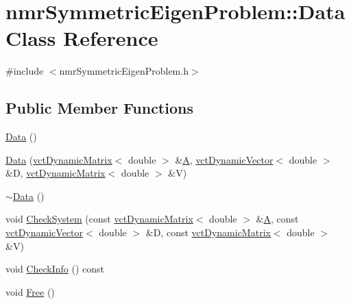 \hypertarget{classnmr_symmetric_eigen_problem_1_1_data}{}\section{nmr\+Symmetric\+Eigen\+Problem\+:\+:Data Class Reference}
\label{classnmr_symmetric_eigen_problem_1_1_data}


{\ttfamily \#include $<$nmr\+Symmetric\+Eigen\+Problem.\+h$>$}

\subsection*{Public Member Functions}
\begin{DoxyCompactItemize}
\item 
\hyperlink{classnmr_symmetric_eigen_problem_1_1_data_ab47d7e5d47a9f6a75f463c1af12c0719}{Data} ()
\item 
\hyperlink{classnmr_symmetric_eigen_problem_1_1_data_a3e60769966b903dbba7934c535393b1f}{Data} (\hyperlink{classvct_dynamic_matrix}{vct\+Dynamic\+Matrix}$<$ double $>$ \&\hyperlink{classnmr_symmetric_eigen_problem_1_1_data_aa45f414eef4fb85b15868757aa728448}{A}, \hyperlink{classvct_dynamic_vector}{vct\+Dynamic\+Vector}$<$ double $>$ \&D, \hyperlink{classvct_dynamic_matrix}{vct\+Dynamic\+Matrix}$<$ double $>$ \&V)
\item 
\hyperlink{classnmr_symmetric_eigen_problem_1_1_data_a4f96b51dba64f2160c5a0362620b009d}{$\sim$\+Data} ()
\item 
void \hyperlink{classnmr_symmetric_eigen_problem_1_1_data_a555f17d5c94a1f7c4068160b5ca4d7f0}{Check\+System} (const \hyperlink{classvct_dynamic_matrix}{vct\+Dynamic\+Matrix}$<$ double $>$ \&\hyperlink{classnmr_symmetric_eigen_problem_1_1_data_aa45f414eef4fb85b15868757aa728448}{A}, const \hyperlink{classvct_dynamic_vector}{vct\+Dynamic\+Vector}$<$ double $>$ \&D, const \hyperlink{classvct_dynamic_matrix}{vct\+Dynamic\+Matrix}$<$ double $>$ \&V)
\item 
void \hyperlink{classnmr_symmetric_eigen_problem_1_1_data_a033b1e23dd6b104573c14bc441b15c4d}{Check\+Info} () const 
\item 
void \hyperlink{classnmr_symmetric_eigen_problem_1_1_data_a388d72081578e7e61438c33de468e359}{Free} ()
\end{DoxyCompactItemize}
